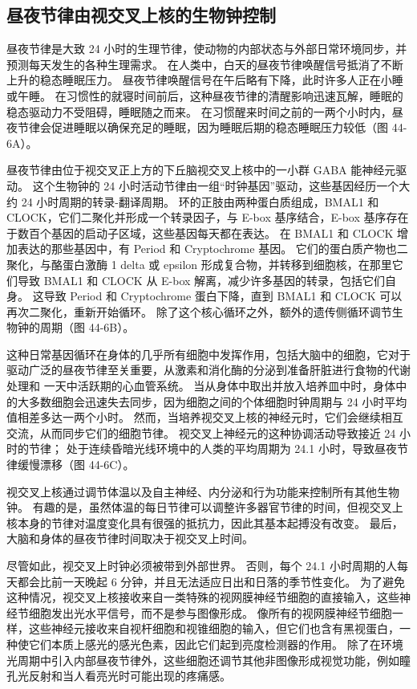 \subsection{昼夜节律由视交叉上核的生物钟控制}
昼夜节律是大致 24 小时的生理节律，使动物的内部状态与外部日常环境同步，并预测每天发生的各种生理需求。 在人类中，白天的昼夜节律唤醒信号抵消了不断上升的稳态睡眠压力。 昼夜节律唤醒信号在午后略有下降，此时许多人正在小睡或午睡。 在习惯性的就寝时间前后，这种昼夜节律的清醒影响迅速瓦解，睡眠的稳态驱动力不受阻碍，睡眠随之而来。 在习惯醒来时间之前的一两个小时内，昼夜节律会促进睡眠以确保充足的睡眠，因为睡眠后期的稳态睡眠压力较低（图 44-6A）。

昼夜节律由位于视交叉正上方的下丘脑视交叉上核中的一小群 GABA 能神经元驱动。 这个生物钟的 24 小时活动节律由一组“时钟基因”驱动，这些基因经历一个大约 24 小时周期的转录-翻译周期。 环的正肢由两种蛋白质组成，BMAL1 和 CLOCK，它们二聚化并形成一个转录因子，与 E-box 基序结合，E-box 基序存在于数百个基因的启动子区域，这些基因每天都在表达。 在 BMAL1 和 CLOCK 增加表达的那些基因中，有 Period 和 Cryptochrome 基因。 它们的蛋白质产物也二聚化，与酪蛋白激酶 1 delta 或 epsilon 形成复合物，并转移到细胞核，在那里它们导致 BMAL1 和 CLOCK 从 E-box 解离，减少许多基因的转录，包括它们自身。 这导致 Period 和 Cryptochrome 蛋白下降，直到 BMAL1 和 CLOCK 可以再次二聚化，重新开始循环。 除了这个核心循环之外，额外的遗传侧循环调节生物钟的周期（图 44-6B）。

这种日常基因循环在身体的几乎所有细胞中发挥作用，包括大脑中的细胞，它对于驱动广泛的昼夜节律至关重要，从激素和消化酶的分泌到准备肝脏进行食物的代谢处理和 一天中活跃期的心血管系统。 当从身体中取出并放入培养皿中时，身体中的大多数细胞会迅速失去同步，因为细胞之间的个体细胞时钟周期与 24 小时平均值相差多达一两个小时。 然而，当培养视交叉上核的神经元时，它们会继续相互交流，从而同步它们的细胞节律。 视交叉上神经元的这种协调活动导致接近 24 小时的节律； 处于连续昏暗光线环境中的人类的平均周期为 24.1 小时，导致昼夜节律缓慢漂移（图 44-6C）。

视交叉上核通过调节体温以及自主神经、内分泌和行为功能来控制所有其他生物钟。 有趣的是，虽然体温的每日节律可以调整许多器官节律的时间，但视交叉上核本身的节律对温度变化具有很强的抵抗力，因此其基本起搏没有改变。 最后，大脑和身体的昼夜节律时间取决于视交叉上时间。

尽管如此，视交叉上时钟必须被带到外部世界。 否则，每个 24.1 小时周期的人每天都会比前一天晚起 6 分钟，并且无法适应日出和日落的季节性变化。 为了避免这种情况，视交叉上核接收来自一类特殊的视网膜神经节细胞的直接输入，这些神经节细胞发出光水平信号，而不是参与图像形成。 像所有的视网膜神经节细胞一样，这些神经元接收来自视杆细胞和视锥细胞的输入，但它们也含有黑视蛋白，一种使它们本质上感光的感光色素，因此它们起到亮度检测器的作用。 除了在环境光周期中引入内部昼夜节律外，这些细胞还调节其他非图像形成视觉功能，例如瞳孔光反射和当人看亮光时可能出现的疼痛感。

